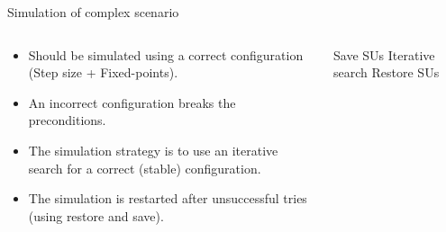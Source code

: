\documentclass{beamer}
\begin{document}
\begin{frame}{Simulation of complex scenario}
    \begin{columns}[T]
        \begin{column}{0.5\textwidth}
            \begin{itemize}
                \item Should be simulated using a correct configuration (Step size + Fixed-points).
                \item An incorrect configuration breaks the preconditions.
                \item The simulation strategy is to use an iterative search for a correct (stable) configuration.
                \item The simulation is restarted after unsuccessful tries (using restore and save).
            \end{itemize}
        \end{column}
        \begin{column}{0.5\textwidth}
            \begin{algorithm}[H]
                \caption{Simulation of complex scenarios.}
            \label{alg:algorithm_step}
            \begin{algorithmic}[1]
              \scriptsize
                \State Save SUs
                \State Iterative search
                    \State Restore SUs
                \EndIf
                \EndWhile
            \end{algorithmic} 
          \end{algorithm}
        \end{column}
    \end{columns}    
\end{frame}
\end{document}
